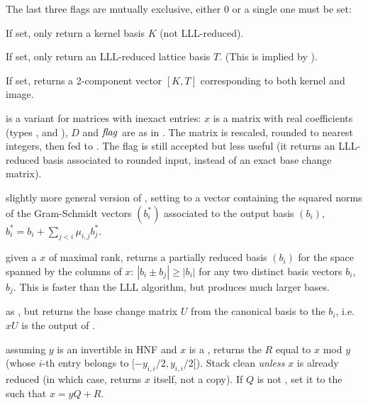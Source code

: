 The last three flags are mutually exclusive, either 0 or a single one must be
set:

\item  {} If set, only return a kernel basis $K$ (not LLL-reduced).

\item  {} If set, only return an LLL-reduced lattice basis $T$.
(This is implied by ).

\item  {} If set, returns a 2-component vector $[K, T]$
corresponding to both kernel and image.


 is a variant for matrices
with inexact entries: $x$ is a matrix with real coefficients (types
,  and ), $D$ and $\hbox{\it f\kern0pt lag\/}$ are as in .
The matrix is rescaled, rounded to nearest integers, then fed to
. The flag  is still accepted but less useful
(it returns an LLL-reduced basis associated to rounded input, instead of an
exact base change matrix).

 slightly more
general version of , setting  to a vector containing
the squared norms of the Gram-Schmidt vectors $(b_i^*)$ associated to the
output basis $(b_i)$, $b_i^* = b_i + \sum_{j < i} \mu_{i,j} b_j^*$.


 given a  $x$ of maximal rank,
returns a partially reduced basis $(b_i)$ for the space spanned by the
columns of $x$: $|b_i \pm b_j| \geq |b_i|$ for any two distinct basis vectors
$b_i$, $b_j$. This is faster than the LLL algorithm, but produces much larger
bases.

 as , but returns
the base change matrix $U$ from the canonical basis to the $b_i$, i.e. $x U$
is the output of .


 assuming $y$ is an
invertible  in HNF and $x$ is a , returns the  $R$
equal to $x$ mod $y$ (whose $i$-th entry belongs to $[-y_{i,i}/2, y_{i,i}/2[$).
Stack clean \emph{unless} $x$ is already reduced (in which case, returns $x$
itself, not a copy). If $Q$ is not , set it to the  such that
$x = yQ + R$.

